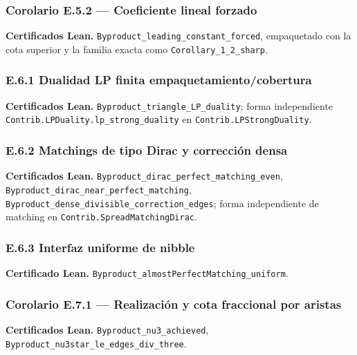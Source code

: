 \documentclass[spanish,11pt,a4paper]{article}
\begin{document}
\subsubsection{Corolario E.5.2 --- Coeficiente lineal
forzado}\label{corolario-e.5.2-coeficiente-lineal-forzado}

\textbf{Certificados Lean.}
\nolinkurl{Byproduct_leading_constant_forced}, empaquetado con la cota
superior y la familia exacta como \nolinkurl{Corollary_1_2_sharp}.

\subsubsection{E.6.1 Dualidad LP finita
empaquetamiento/cobertura}\label{e.6.1-dualidad-lp-finita-empaquetamientocobertura}

\textbf{Certificados Lean.} \nolinkurl{Byproduct_triangle_LP_duality};
forma independiente \nolinkurl{Contrib.LPDuality.lp_strong_duality} en
\nolinkurl{Contrib.LPStrongDuality}.

\subsubsection{E.6.2 Matchings de tipo Dirac y corrección
densa}\label{e.6.2-matchings-de-tipo-dirac-y-correcciuxf3n-densa}

\textbf{Certificados Lean.}
\nolinkurl{Byproduct_dirac_perfect_matching_even},
\nolinkurl{Byproduct_dirac_near_perfect_matching},
\nolinkurl{Byproduct_dense_divisible_correction_edges}; forma
independiente de matching en \nolinkurl{Contrib.SpreadMatchingDirac}.

\subsubsection{E.6.3 Interfaz uniforme de
nibble}\label{e.6.3-interfaz-uniforme-de-nibble}

\textbf{Certificado Lean.}
\nolinkurl{Byproduct_almostPerfectMatching_uniform}.

\subsubsection{Corolario E.7.1 --- Realización y cota fraccional por
aristas}\label{corolario-e.7.1-realizaciuxf3n-y-cota-fraccional-por-aristas}

\textbf{Certificados Lean.} \nolinkurl{Byproduct_nu3_achieved},
\nolinkurl{Byproduct_nu3star_le_edges_div_three}.
\end{document}
